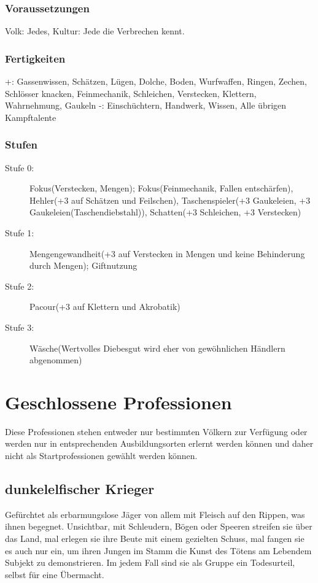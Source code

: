 \documentclass[a4paper,12pt,oneside]{book}
\begin{document}
\subsection{Voraussetzungen}
Volk: Jedes, Kultur: Jede die Verbrechen kennt.
\subsection{Fertigkeiten}
+: Gassenwissen, Schätzen, Lügen, Dolche, Boden, Wurfwaffen, Ringen, Zechen, Schlösser knacken, Feinmechanik, Schleichen, Verstecken, Klettern, Wahrnehmung, Gaukeln
-: Einschüchtern, Handwerk, Wissen, Alle übrigen Kampftalente
\subsection{Stufen}
\begin{description}
\item[Stufe 0:] Fokus(Verstecken, Mengen); Fokus(Feinmechanik, Fallen entschärfen), Hehler(+3 auf Schätzen und Feilschen), Taschenspieler(+3 Gaukeleien, +3 Gaukeleien(Taschendiebstahl)), Schatten(+3 Schleichen, +3 Verstecken)
\item[Stufe 1:] Mengengewandheit(+3 auf Verstecken in Mengen und keine Behinderung durch Mengen); Giftnutzung
\item[Stufe 2:] Pacour(+3 auf Klettern und Akrobatik)
\item[Stufe 3:] Wäsche(Wertvolles Diebesgut wird eher von gewöhnlichen Händlern abgenommen)
\end{description}
%
\chapter{Geschlossene Professionen}
Diese Professionen stehen entweder nur bestimmten Völkern zur Verfügung oder werden nur in entsprechenden Ausbildungsorten erlernt werden können und daher nicht als Startprofessionen gewählt werden können.
\section{dunkelelfischer Krieger}
Gefürchtet als erbarmungslose Jäger von allem mit Fleisch auf den Rippen, was ihnen begegnet. Unsichtbar, mit Schleudern, Bögen oder Speeren streifen sie über das Land, mal erlegen sie ihre Beute mit einem gezielten Schuss, mal fangen sie es auch nur ein, um ihren Jungen im Stamm die Kunst des Tötens am Lebendem Subjekt zu demonstrieren. Im jedem Fall sind sie als Gruppe ein Todesurteil, selbst für eine Übermacht.
\end{document}
